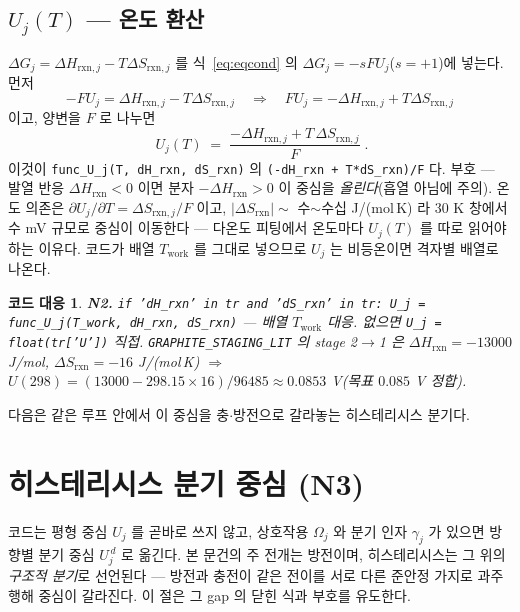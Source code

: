 \documentclass[11pt,a4paper]{article}
\newtheorem*{codebox}{코드 대응}
\newcommand{\rxn}{\mathrm{rxn}}
\newcommand{\work}{\mathrm{work}}
\newcommand{\code}[1]{\texttt{#1}}
\begin{document}
\subsection{$U_j(T)$ — 온도 환산}
$\Delta G_j=\Delta H_{\rxn,j}-T\Delta S_{\rxn,j}$ 를 식~\eqref{eq:eqcond} 의 $\Delta G_j=-sFU_j$($s=+1$)에 넣는다. 먼저
\begin{equation}
-F U_j=\Delta H_{\rxn,j}-T\Delta S_{\rxn,j}
\quad\Longrightarrow\quad
F U_j=-\Delta H_{\rxn,j}+T\Delta S_{\rxn,j}
\label{eq:UjderiveC}
\end{equation}
이고, 양변을 $F$ 로 나누면
\begin{equation}
\boxed{\;U_j(T)\;=\;\frac{-\Delta H_{\rxn,j}+T\,\Delta S_{\rxn,j}}{F}\;.}
\label{eq:Uj}
\end{equation}
이것이 \code{func\_U\_j(T, dH\_rxn, dS\_rxn)} 의 \code{(-dH\_rxn + T*dS\_rxn)/F} 다. 부호 — 발열 반응
$\Delta H_\rxn<0$ 이면 분자 $-\Delta H_\rxn>0$ 이 중심을 \emph{올린다}(흡열 아님에 주의). 온도 의존은
$\partial U_j/\partial T=\Delta S_{\rxn,j}/F$ 이고, $|\Delta S_\rxn|\sim$ 수$\sim$수십 J/(mol\,K) 라 $30$ K 창에서 수 mV
규모로 중심이 이동한다 — 다온도 피팅에서 온도마다 $U_j(T)$ 를 따로 읽어야 하는 이유다. 코드가 배열 $T_\work$ 를 그대로
넣으므로 $U_j$ 는 비등온이면 격자별 배열로 나온다.

\begin{codebox}
\textbf{N2.} \code{if 'dH\_rxn' in tr and 'dS\_rxn' in tr: U\_j = func\_U\_j(T\_work, dH\_rxn, dS\_rxn)}
— 배열 $T_\work$ 대응. 없으면 \code{U\_j = float(tr['U'])} 직접. \code{GRAPHITE\_STAGING\_LIT} 의 stage 2$\to$1 은
$\Delta H_\rxn=-13000$ J/mol, $\Delta S_\rxn=-16$ J/(mol\,K) $\Rightarrow$ $U(298)=(13000-298.15\times16)/96485
\approx0.0853$ V(목표 $0.085$ V 정합).
\end{codebox}

다음은 같은 루프 안에서 이 중심을 충$\cdot$방전으로 갈라놓는 히스테리시스 분기다.

\section{히스테리시스 분기 중심 (N3)}\label{sec:hys}
코드는 평형 중심 $U_j$ 를 곧바로 쓰지 않고, 상호작용 $\Omega_j$ 와 분기 인자 $\gamma_j$ 가 있으면 방향별 분기 중심
$U_j^{\,d}$ 로 옮긴다. 본 문건의 주 전개는 방전이며, 히스테리시스는 그 위의 \emph{구조적 분기}로 선언된다 — 방전과 충전이
같은 전이를 서로 다른 준안정 가지로 과주행해 중심이 갈라진다. 이 절은 그 gap 의 닫힌 식과 부호를 유도한다.
\end{document}
